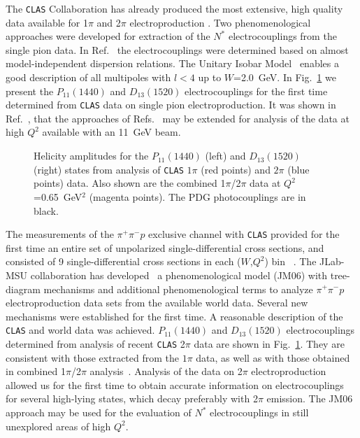 The {\tt CLAS} Collaboration has already produced the most extensive,
high quality data available for 1$\pi$ and 2$\pi$ electroproduction
\cite{Bur1,Bu05}. Two phenomenological approaches
\cite{Az03a,Az03b} were developed for extraction of the $N^*$ 
electrocouplings from the single pion data.  In Ref.~\cite{Az03a} the 
electrocouplings were determined based on almost model-independent 
dispersion relations. The Unitary Isobar Model~\cite{Az03b} enables a 
good description of all multipoles with $l<4$ up to $W$=2.0~GeV. In 
Fig.~\ref{fig:p11d13states} we present the $P_{11}(1440)$ and 
$D_{13}(1520)$ electrocouplings for the first time determined from 
{\tt CLAS} data on single pion electroproduction. It was shown in 
Ref.~\cite{Pr06}, that the approaches of Refs.~\cite{Az03a,Az03b} may 
be extended for analysis of the data at high $Q^2$ available with an 
11~GeV beam.

\begin{figure}[ht]
\vspace{6.0cm}
\caption{\small{Helicity amplitudes for the $P_{11}(1440)$ (left) and  
$D_{13}(1520)$ (right) states from analysis of {\tt CLAS} $1\pi$ (red 
points) and $2\pi$ (blue points) data. Also shown are the combined 
1$\pi$/2$\pi$ data at $Q^2$=0.65~GeV$^2$ (magenta points). The PDG
photocouplings are in black.}}
\label{fig:p11d13states}
\end{figure}

The measurements of the $\pi^+\pi^-p$ exclusive channel with {\tt CLAS}  
provided for the first time an entire set of unpolarized single-differential 
cross sections, and consisted of 9 single-differential cross sections in each 
($W$,$Q^2$) bin ~\cite{Mo06,clas3pi}.  The JLab-MSU collaboration has 
developed~\cite{Mo06,Bu04} a phenomenological model (JM06) with tree-diagram 
mechanisms and additional phenomenological terms to analyze $\pi^+\pi^-p$ 
electroproduction data sets from the available world data. Several new 
mechanisms were established for the first time. A reasonable description 
of the {\tt CLAS} and world data was achieved. $P_{11}(1440)$ and 
$D_{13}(1520)$ electrocouplings determined from analysis of recent {\tt CLAS} 
2$\pi$ data are shown in Fig.~\ref{fig:p11d13states}.  They are consistent 
with those extracted from the $1\pi$ data, as well as with those obtained in 
combined 1$\pi$/2$\pi$  analysis~\cite{Az05}.  Analysis of the data on 
2$\pi$ electroproduction allowed us for the first time to obtain accurate 
information on electrocouplings for several high-lying states, which decay 
preferably with 2$\pi$ emission.  The JM06 approach may be used for the 
evaluation of $N^*$ electrocouplings in still unexplored areas of high $Q^2$.

